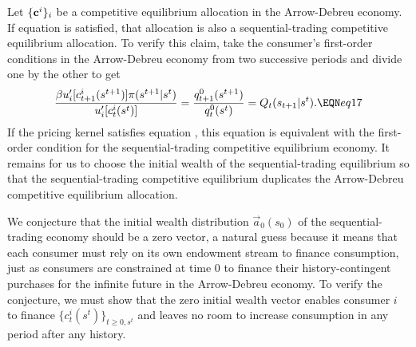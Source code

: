 Let
$\{{\bf c}^i \}_i$ be a competitive equilibrium allocation
in the Arrow-Debreu economy.
If equation  is satisfied, that allocation is also a
sequential-trading competitive equilibrium allocation.  To verify this claim,
take the consumer's first-order conditions  in the Arrow-Debreu
economy from two successive periods and divide one by
the other to get
$$ {\beta u'_i[c_{t+1}^i(s^{t+1})] \pi(s^{t+1} | s^t) \over
       u'_i[c_t^i(s^t)]} = {q^0_{t+1}(s^{t+1}) \over q_t^0(s^t) }
   = Q_t(s_{t+1}\vert s^t).  \EQN eq17 $$
If the pricing kernel satisfies equation , this equation
is equivalent with the first-order condition  for the sequential-trading
competitive equilibrium economy. It remains for us
to choose the initial wealth of the sequential-trading equilibrium so
that the sequential-trading competitive equilibrium duplicates the
Arrow-Debreu competitive equilibrium allocation.


We conjecture that the initial wealth distribution
$\vec { a}_0(s_0)$ of the sequential-trading economy should be a zero vector, a natural guess because
it means that each consumer must rely on its own
endowment stream to finance consumption, just as consumers are
constrained at time $0$ to finance their history-contingent purchases
for the infinite future  in the Arrow-Debreu economy.
To  verify  the conjecture, we must show that the zero
initial wealth vector enables consumer $i$ to finance $\{c^i_t(s^t)\}_{t \geq 0, s^t}$
and leaves no room to increase consumption in any period
 after any history.


